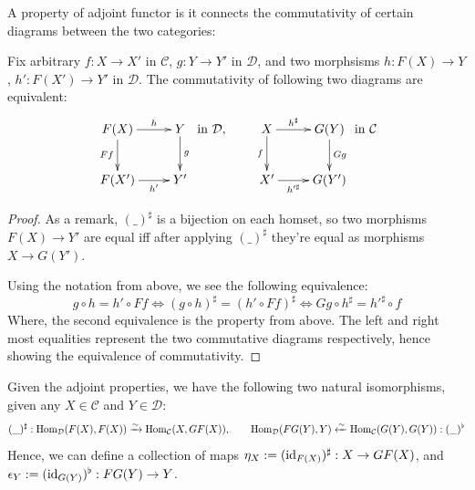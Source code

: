 \documentclass{article}
\begin{document}
\hfil

A property of adjoint functor is it connects the commutativity of certain diagrams between the two categories:

\begin{lem}
Fix arbitrary $f:X\rightarrow X'$ in $\mathcal{C}$, $g:Y\rightarrow Y'$ in $\mathcal{D}$, and two morphsisms $h:F(X)\rightarrow Y$, $h':F(X')\rightarrow Y'$ in $\mathcal{D}$. The commutativity of following two diagrams are equivalent:
\[\xymatrix{
    F(X) \ar[d]_-{Ff} \ar[r]^-{h} & Y \ar[d]^-{g}\\
    F(X')\ar[r]_-{h'} & Y'
} \text{ in }\mathcal{D},\quad \quad \xymatrix{
    X \ar[d]_-{f} \ar[r]^-{h^\sharp} & G(Y) \ar[d]^-{Gg}\\
    X'\ar[r]_-{h'^\sharp} & G(Y')
} \text{ in }\mathcal{C}\]
\end{lem}
\begin{proof}
    As a remark, $(\_)^\sharp$ is a bijection on each homset, so two morphisms $F(X)\rightarrow Y'$ are equal iff after applying $(\_)^\sharp$ they're equal as morphisms $X\rightarrow G(Y')$. 
    
    Using the notation from above, we see the following equivalence:
    \[g\circ h=h'\circ Ff \iff (g\circ h)^\sharp = (h'\circ Ff)^\sharp \iff Gg\circ h^\sharp = h'^\sharp \circ f \]
    Where, the second equivalence is the property from above. The left and right most equalities represent the two commutative diagrams respectively, hence showing the equivalence of commutativity.
\end{proof}

\hfil

Given the adjoint properties, we have the following two natural isomorphisms, given any $X\in\mathcal{C}$ and $Y\in\mathcal{D}$:
\[(\_)^\sharp:\mathrm{Hom}_\mathcal{D}(F(X),F(X))\xrightarrow{\sim} \mathrm{Hom}_\mathcal{C}(X,GF(X)),\quad\quad \mathrm{Hom}_\mathcal{D}(FG(Y),Y)\xleftarrow{\sim} \mathrm{Hom}_\mathcal{C}(G(Y),G(Y)):(\_)^\flat\]
Hence, we can define a collection of maps $\eta_X := (\mathrm{id}_{F(X)})^\sharp:X\rightarrow GF(X)$, and $\epsilon_Y := (\mathrm{id}_{G(Y)})^\flat:FG(Y)\rightarrow Y$.
\end{document}
